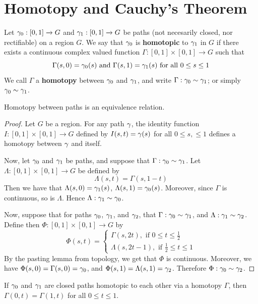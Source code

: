 \section{Homotopy and Cauchy's Theorem}

\begin{definition}
    Let $\gamma_0:[0,1] \xrightarrow{} G$ and $\gamma_1:[0,1] \xrightarrow{} G$ be
    paths (not necesarily closed, nor rectifiable) on a region $G$. We say that
    $\gamma_0$ is \textbf{homotopic}
    to $\gamma_1$ in $G$ if there exists a continuous complex valued function
    $\Gamma:[0,1] \times [0,1] \xrightarrow{} G$ such that
    \begin{equation*}
        \Gamma(s,0)=\gamma_0(s) \text{ and } \Gamma(s,1)=\gamma_1(s) \text{ for all } 0
        \leq s \leq 1
    \end{equation*}
    We call $\Gamma$ a  \textbf{homotopy} between $\gamma_0$ and $\gamma_1$, and write
    $\Gamma:\gamma_0 \sim \gamma_1$; or simply $\gamma_0 \sim \gamma_1$.
\end{definition}

\begin{lemma}\label{4.6.1}
    Homotopy between paths is an equivalence relation.
\end{lemma}
\begin{proof}
    Let $G$ be a region. For any path $\gamma$, the identity function $I:[0,1] \times
    [0,1]  \xrightarrow{} G$ defined by  $I(s,t)=\gamma(s)$ for all $0 \leq s, \leq 1$
    defines a homotopy between $\gamma$ and itself.

    Now, let $\gamma_0$ and $\gamma_1$ be paths, and suppose that $\Gamma:\gamma_0 \sim \gamma_1$.
    Let $\Lambda:[0,1] \times [0,1] \xrightarrow{} G$ be defined by
    \begin{equation*}
        \Lambda(s,t)=\Gamma(s,1-t)
    \end{equation*}
    Then we have that $\Lambda(s,0)=\gamma_1(s)$, $\Lambda(s,1)=\gamma_0(s)$. Moreover,
    since $\Gamma$ is continuous, so is $\Lambda$. Hence  $\Lambda: \gamma_1 \sim \gamma_0$.

    Now, suppose that for paths $\gamma_0$, $\gamma_1$, and $\gamma_2$, that $\Gamma: \gamma_0
    \sim \gamma_1$, and $\Lambda:\gamma_1 \sim \gamma_2$. Define then $\Phi:[0,1] \times [0,1]
    \xrightarrow{} G$ by
    \begin{equation*}
        \Phi(s,t)=\begin{cases}
            \Gamma(s,2t), \text{ if } 0 \leq t \leq \frac{1}{2} \\
            \Lambda(s,2t-1), \text{ if } \frac{1}{2} \leq t \leq 1
        \end{cases}
    \end{equation*}
    By the pasting lemma from topology, we get that $\Phi$ is continuous.
    Moreover, we have $\Phi(s,0)=\Gamma(s,0)=\gamma_0$, and
    $\Phi(s,1)=\Lambda(s,1)=\gamma_2$. Therefore  $\Phi: \gamma_0 \sim \gamma_2$.
\end{proof}
\begin{corollary}
    If $\gamma_0$ and $\gamma_1$ are closed paths homotopic to each other via a homotopy
    $\Gamma$, then  $\Gamma(0,t)=\Gamma(1,t)$ for all $0 \leq t \leq 1$.
\end{corollary}

